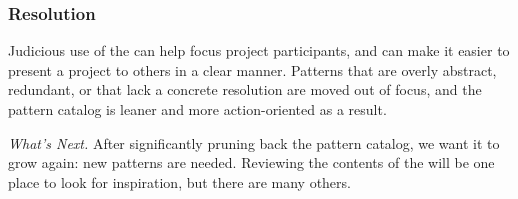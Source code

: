 \subsubsection*{Resolution} 
Judicious use of the  can help focus project participants, and can make it easier to present a project to others in a clear manner.  Patterns that are overly abstract, redundant, or that lack a concrete resolution are moved out of focus, and the pattern catalog is leaner and more action-oriented as a result.

\begin{framed}
\emph{What's Next.}
After significantly pruning back the pattern catalog, we want it to grow again: new patterns are needed.  Reviewing the contents of the  will be one place to look for inspiration, but there are many others.
\end{framed}


